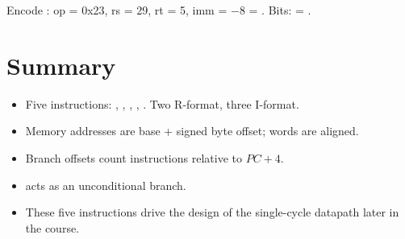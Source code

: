 \begin{example}
Encode : op = 0x23, rs = 29, rt = 5, imm = $-8$
= . Bits: 
= .
\end{example}

\section*{Summary}
\begin{itemize}
  \item Five instructions: , , , ,
    . Two R-format, three I-format.
  \item Memory addresses are base + signed byte offset; words are aligned.
  \item Branch offsets count instructions relative to $PC+4$.
  \item {} acts as an unconditional branch.
  \item These five instructions drive the design of the single-cycle
    datapath later in the course.
\end{itemize}
